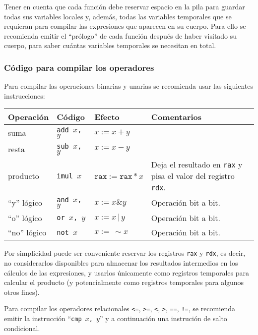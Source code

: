 \documentclass{article}
\begin{document}
Tener en cuenta que cada funci\'on debe reservar espacio
en la pila para guardar todas sus variables locales
y, adem\'as, todas las variables temporales que se requieran para
compilar las expresiones que aparecen en su cuerpo.
Para ello se recomienda emitir el ``pr\'ologo'' de cada
funci\'on despu\'es de haber visitado su cuerpo, para
saber cu\'antas variables temporales se necesitan en total.

\subsubsection{C\'odigo para compilar los operadores}

Para compilar las operaciones binarias y unarias se recomienda
usar las siguientes instrucciones:
\begin{center}
\begin{tabular}{l|l|l|l}
{\bf Operaci\'on} & {\bf C\'odigo} & {\bf Efecto} & {\bf Comentarios} \\
\hline
suma  & \texttt{add $x$, $y$} & $x := x + y$ \\
resta & \texttt{sub $x$, $y$} & $x := x - y$ \\
producto & \texttt{imul $x$} & $\texttt{rax} := \texttt{rax} * x$ & Deja el resultado en \texttt{rax} y pisa el valor del registro \texttt{rdx}. \\
``y'' l\'ogico & \texttt{and $x$, $y$} & $x := x \& y$ & Operaci\'on bit a bit.\\
``o'' l\'ogico & \texttt{or $x$, $y$} & $x := x \,|\, y$ & Operaci\'on bit a bit.\\
``no'' l\'ogico & \texttt{not $x$} & $x := \,\sim\!x$ & Operaci\'on bit a bit.\\
\end{tabular}
\end{center}
Por simplicidad puede ser conveniente reservar los registros
\texttt{rax} y \texttt{rdx}, es decir, no considerarlos
disponibles para almacenar los resultados intermedios en
los c\'alculos de las expresiones, y usarlos \'unicamente como
registros temporales para calcular el producto (y potencialmente
como registros temporales para algunos otros fines).

Para compilar los operadores relacionales
\texttt{<=}, \texttt{>=}, \texttt{<}, \texttt{>},
\texttt{==}, \texttt{!=},
se recomienda emitir la instrucci\'on ``\texttt{cmp $x$, $y$}''
y a continuaci\'on una instruci\'on de salto condicional.
\end{document}
